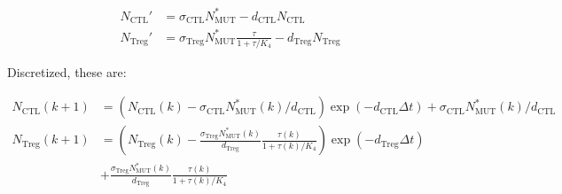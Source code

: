 \documentclass[11pt]{article}
\begin{document}
\begin{equation}\tag{2.9}
\begin{split}
N_\text{CTL}' & = \sigma_{\text{CTL}}N_{\text{MUT}}^* - d_{\text{CTL}}N_\text{CTL} \\
N_\text{Treg}' & = \sigma_{\text{Treg}}N_{\text{MUT}}^* \frac{\tau}{1+\tau/K_4}- d_{\text{Treg}}N_\text{Treg}
\end{split}
\end{equation}

Discretized, these are:

\begin{equation}\tag{2.10}
\begin{split}
N_\text{CTL}(k+1) & =  \left (N_\text{CTL}(k)-\sigma_{\text{CTL}}N_{\text{MUT}}^*(k)/d_{\text{CTL}}\right )\exp(- d_{\text{CTL}}\Delta t) + \sigma_{\text{CTL}}N_{\text{MUT}}^*(k)/d_{\text{CTL}}\\
N_\text{Treg}(k+1) & =  \left (N_\text{Treg}(k)-\frac{\sigma_{\text{Treg}}N_{\text{MUT}}^*(k)}{d_{\text{Treg}}} \frac{\tau(k)}{1+\tau(k)/K_4}\right )\exp(-d_{\text{Treg}}\Delta t)\\
&+ \frac{\sigma_{\text{Treg}}N_{\text{MUT}}^*(k)}{d_{\text{Treg}}} \frac{\tau(k)}{1+\tau(k)/K_4}
\end{split}
\end{equation}
\end{document}
